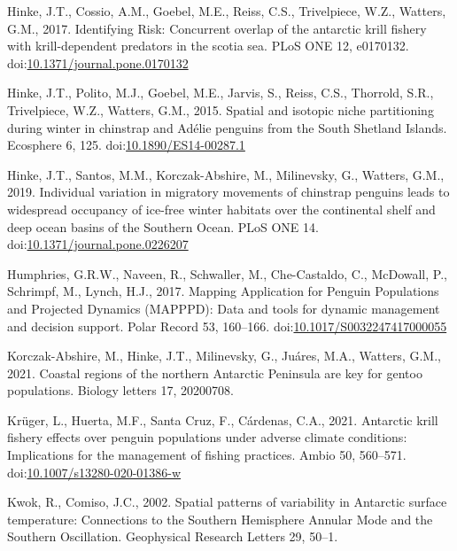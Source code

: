 \documentclass[]{elsarticle} %
\begin{document}
\leavevmode\hypertarget{ref-Hinke2017}{}%
Hinke, J.T., Cossio, A.M., Goebel, M.E., Reiss, C.S., Trivelpiece, W.Z.,
Watters, G.M., 2017. Identifying Risk: Concurrent overlap of the
antarctic krill fishery with krill-dependent predators in the scotia
sea. PLoS ONE 12, e0170132.
doi:\href{https://doi.org/10.1371/journal.pone.0170132}{10.1371/journal.pone.0170132}

\leavevmode\hypertarget{ref-Hinke2015}{}%
Hinke, J.T., Polito, M.J., Goebel, M.E., Jarvis, S., Reiss, C.S.,
Thorrold, S.R., Trivelpiece, W.Z., Watters, G.M., 2015. Spatial and
isotopic niche partitioning during winter in chinstrap and Adélie
penguins from the South Shetland Islands. Ecosphere 6, 125.
doi:\href{https://doi.org/10.1890/ES14-00287.1}{10.1890/ES14-00287.1}

\leavevmode\hypertarget{ref-Hinke2019}{}%
Hinke, J.T., Santos, M.M., Korczak-Abshire, M., Milinevsky, G., Watters,
G.M., 2019. Individual variation in migratory movements of chinstrap
penguins leads to widespread occupancy of ice-free winter habitats over
the continental shelf and deep ocean basins of the Southern Ocean. PLoS
ONE 14.
doi:\href{https://doi.org/10.1371/journal.pone.0226207}{10.1371/journal.pone.0226207}

\leavevmode\hypertarget{ref-Humphries2017}{}%
Humphries, G.R.W., Naveen, R., Schwaller, M., Che-Castaldo, C.,
McDowall, P., Schrimpf, M., Lynch, H.J., 2017. Mapping Application for
Penguin Populations and Projected Dynamics (MAPPPD): Data and tools for
dynamic management and decision support. Polar Record 53, 160--166.
doi:\href{https://doi.org/10.1017/S0032247417000055}{10.1017/S0032247417000055}

\leavevmode\hypertarget{ref-korczak-abshireCoastalRegionsNorthern2021}{}%
Korczak-Abshire, M., Hinke, J.T., Milinevsky, G., Juáres, M.A., Watters,
G.M., 2021. Coastal regions of the northern Antarctic Peninsula are key
for gentoo populations. Biology letters 17, 20200708.

\leavevmode\hypertarget{ref-Kruger2021}{}%
Krüger, L., Huerta, M.F., Santa Cruz, F., Cárdenas, C.A., 2021.
Antarctic krill fishery effects over penguin populations under adverse
climate conditions: Implications for the management of fishing
practices. Ambio 50, 560--571.
doi:\href{https://doi.org/10.1007/s13280-020-01386-w}{10.1007/s13280-020-01386-w}

\leavevmode\hypertarget{ref-kwokSpatialPatternsVariability2002}{}%
Kwok, R., Comiso, J.C., 2002. Spatial patterns of variability in
Antarctic surface temperature: Connections to the Southern Hemisphere
Annular Mode and the Southern Oscillation. Geophysical Research Letters
29, 50--1.
\end{document}
